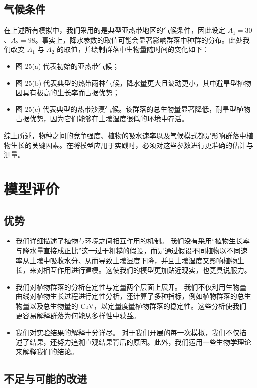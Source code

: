 \documentclass[11pt,a4paper]{ctexart}
\begin{document}
\subsection{气候条件}

在上述所有模拟中，我们采用的是典型亚热带地区的气候条件，因此设定 $A_1=30$、$A_2=98$。事实上，降水参数的取值可能会显著影响群落中种群的分布。此处我们改变 $A_1$ 与 $A_2$ 的取值，并绘制群落中生物量随时间的变化如下：

\begin{itemize}
\item 图 25(a) 代表初始的亚热带气候；
\item 图 25(b) 代表典型的热带雨林气候，降水量更大且波动更小，其中避旱型植物因具有极高的生长率而占据优势；
\item 图 25(c) 代表典型的热带沙漠气候。该群落的总生物量显著降低，耐旱型植物占据优势，因为它们能够在土壤湿度很低的环境中存活。
\end{itemize}

综上所述，物种之间的竞争强度、植物的吸水速率以及气候模式都是影响群落中植物生长的关键因素。在将模型应用于实践时，必须对这些参数进行更准确的估计与测量。

\section{模型评价}

\subsection{优势}

\begin{itemize}
\item 我们详细描述了植物与环境之间相互作用的机制。
我们没有采用“植物生长率与降水量直接成正比”这一过于粗糙的假设，而是通过假设不同植物以不同速率从土壤中吸收水分、从而导致土壤湿度下降，并且土壤湿度又影响植物生长，来对相互作用进行建模。这使我们的模型更加贴近现实，也更具说服力。
\item 我们对植物群落的分析在定性与定量两个层面上展开。
我们不仅利用生物量曲线对植物生长过程进行定性分析，还计算了多种指标，例如植物群落的总生物量以及总生物量的 CoV，以定量度量植物群落的稳定性。这些分析使我们更容易解释群落为何能从多样性中获益。
\item 我们对实验结果的解释十分详尽。
对于我们开展的每一次模拟，我们不仅描述了结果，还努力追溯直观结果背后的原因。此外，我们运用一些生物学理论来解释我们的结论。
\end{itemize}

\subsection{不足与可能的改进}
\end{document}
